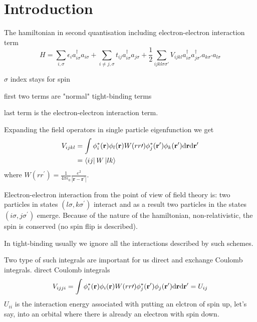 \section{Introduction}
\par{The hamiltonian in second quantisation including electron-electron interaction term}
\begin{equation}
H=\sum_{i,\sigma}\epsilon_ia_{i\sigma}^{\dag}a_{i\sigma}+\sum_{i\neq j,\sigma}t_{ij}a_{i\sigma}^{\dag}a_{j\sigma}+\frac{1}{2}\sum_{ijkl\sigma \sigma{\prime}}
V_{ijkl}a_{i\sigma}^{\dag}a_{j\sigma\prime}^{\dag}a_{k\sigma\prime}a_{l\sigma}
\end{equation}
\par{$\sigma$ index stays for spin}
\par{first two terms are "normal" tight-binding terms}
\par{last term is the electron-electron interaction term.}
\par{Expanding the field operators in single particle eigenfunction we get}
\begin{equation}
\begin{split}
V_{ijkl}&=\int\phi_{i}^{*}({\bf r})\phi_{l}({\bf r})W(rr\prime)\phi_{j}^{*}({\bf r^\prime})\phi_{k}({\bf r^\prime})\text{d}{\bf r}\text{d}{\bf r^\prime}\\
&=\mathinner{\langle{ij}|}W\mathinner{|{lk}\rangle}
\end{split}
\end{equation}
where $W(rr^\prime)=\frac{1}{4\pi\epsilon_0}\frac{e^2}{|\bm{r}-\bm{r^\prime}|}$.
\par{Electron-electron interaction from the point of view of field theory is: two particles in states $(l\sigma,k\sigma^\prime)$ interact and as a result two particles
in the states $(i\sigma,j\sigma^\prime)$ emerge. Because of the nature of the hamiltonian, non-relativistic, the spin is conserved (no spin flip is described).}
\par{In tight-binding usually we ignore all the interactions described by such schemes.}
\par{Two type of such integrals are important for us direct and exchange Coulomb integrals.}
direct Coulomb integrals
\begin{equation}
\label{udef}
V_{ijji}=\int\phi_{i}^{*}({\bf r})\phi_{i}({\bf r})W(rr\prime)\phi_{j}^{*}({\bf r^\prime})\phi_{j}({\bf r^\prime})\text{d}{\bf r}\text{d}{\bf r^\prime}=U_{ij}
\end{equation}
$U_{ii}$ is the interaction energy associated with putting an elctron of spin up, let's say, into an orbital where there is already an electron with spin down.\\

